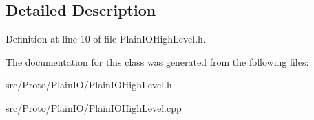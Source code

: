 \subsection{Detailed Description}


Definition at line 10 of file PlainIOHighLevel.h.



The documentation for this class was generated from the following files:\begin{DoxyCompactItemize}
\item 
src/Proto/PlainIO/PlainIOHighLevel.h\item 
src/Proto/PlainIO/PlainIOHighLevel.cpp\end{DoxyCompactItemize}
